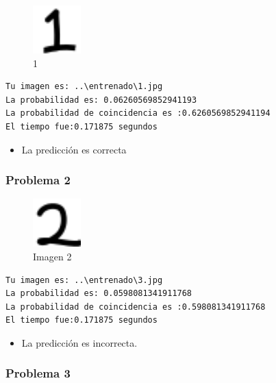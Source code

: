 \documentclass[
  spanish,
]{article}
\providecommand{\tightlist}{%
  \setlength{\itemsep}{0pt}\setlength{\parskip}{0pt}}
\begin{document}
\begin{figure}
\centering
\includegraphics[width=0.72917in,height=\textheight]{img/README/1-16526373701691.png}
\caption{1}
\end{figure}

\begin{verbatim}
Tu imagen es: ..\entrenado\1.jpg
La probabilidad es: 0.06260569852941193
La probabilidad de coincidencia es :0.6260569852941194
El tiempo fue:0.171875 segundos
\end{verbatim}

\begin{itemize}
\tightlist
\item
  La predicción es correcta
\end{itemize}

\hypertarget{problema-2}{%
\subsubsection{Problema 2}\label{problema-2}}

\begin{figure}
\centering
\includegraphics[width=0.72917in,height=\textheight]{documentacion/img/2.png}
\caption{Imagen 2}
\end{figure}

\begin{verbatim}
Tu imagen es: ..\entrenado\3.jpg
La probabilidad es: 0.0598081341911768
La probabilidad de coincidencia es :0.598081341911768
El tiempo fue:0.171875 segundos
\end{verbatim}

\begin{itemize}
\tightlist
\item
  La predicción es incorrecta.
\end{itemize}

\hypertarget{problema-3}{%
\subsubsection{Problema 3}\label{problema-3}}
\end{document}
